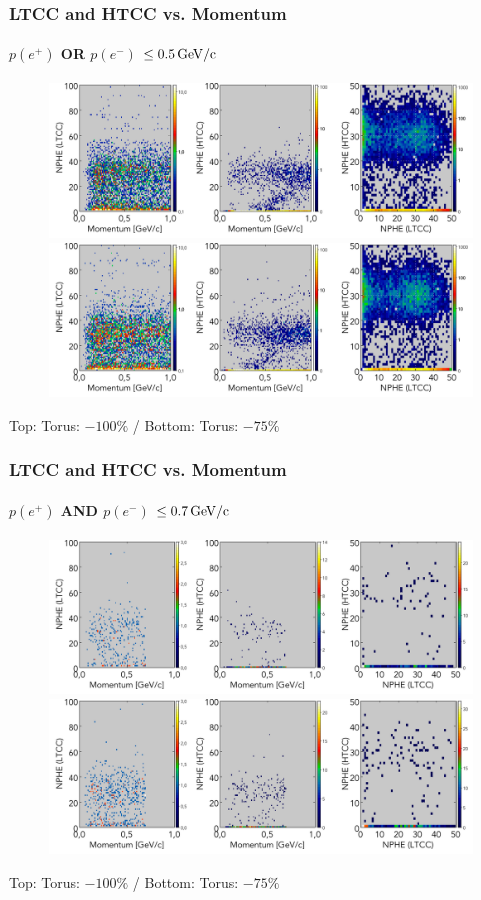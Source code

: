 \documentclass[xcolor=table, xcolor=dvipsnames]{beamer}
\begin{document}
\begin{frame}
	        \frametitle{LTCC and HTCC vs. Momentum}
	        \footnotesize
           \framesubtitle{$p(e^+)$ OR $p(e^-)$ $\le 0.5\,\rm{GeV/c}$}
           
           \begin{figure}
             \includegraphics[width=1\textwidth,height=0.25\textwidth]{triggerStudies_Tor1_cut05_LTCC_HTCC_P_OUT.png}\\
             \includegraphics[width=1\textwidth,height=0.25\textwidth]{triggerStudies_Tor075_cut05_LTCC_HTCC_P_OUT.png}
           \end{figure}
           
           Top: Torus: $-100\%$ / Bottom: Torus: $-75\%$
\end{frame}

\begin{frame}
	        \frametitle{LTCC and HTCC vs. Momentum}
	        \footnotesize
           \framesubtitle{$p(e^+)$ AND $p(e^-)$ $\le 0.7\,\rm{GeV/c}$}
           
           \begin{figure}
             \includegraphics[width=1\textwidth,height=0.25\textwidth]{triggerStudies_Tor1_cut07_LTCC_HTCC_P_IN.png}\\
             \includegraphics[width=1\textwidth,height=0.25\textwidth]{triggerStudies_Tor075_cut07_LTCC_HTCC_P_IN.png}
           \end{figure}
           
           Top: Torus: $-100\%$ / Bottom: Torus: $-75\%$
\end{frame}
\end{document}
